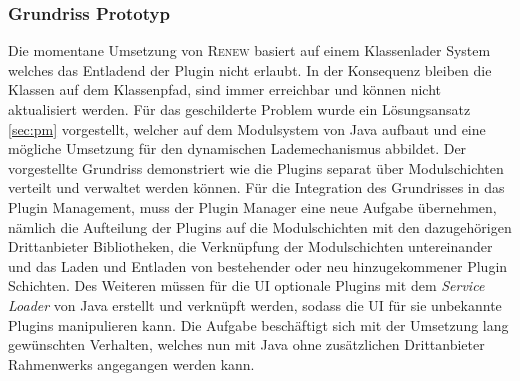  \subsubsection{Grundriss Prototyp}
	Die momentane Umsetzung von \textsc{Renew} basiert auf einem Klassenlader System welches das Entladend der Plugin nicht erlaubt. In der Konsequenz bleiben die Klassen auf dem Klassenpfad, sind immer erreichbar und können nicht aktualisiert werden. Für das geschilderte Problem wurde ein Lösungsansatz \ref{sec:pm} vorgestellt, welcher auf dem Modulsystem von Java aufbaut und eine mögliche Umsetzung für den dynamischen Lademechanismus abbildet. Der vorgestellte Grundriss demonstriert wie die Plugins separat über Modulschichten verteilt und verwaltet werden können.\newline
	Für die Integration des Grundrisses in das Plugin Management, muss der Plugin Manager eine neue Aufgabe übernehmen, nämlich die Aufteilung der Plugins auf die Modulschichten mit den dazugehörigen Drittanbieter Bibliotheken, die Verknüpfung der Modulschichten untereinander und das Laden und Entladen von bestehender oder neu hinzugekommener Plugin Schichten. Des Weiteren müssen für die UI optionale Plugins mit dem \textit{Service Loader} von Java erstellt und verknüpft werden, sodass die UI für sie unbekannte Plugins manipulieren kann. \newline
	Die Aufgabe beschäftigt sich mit der Umsetzung lang gewünschten Verhalten, welches nun mit Java ohne zusätzlichen Drittanbieter Rahmenwerks angegangen werden kann. 






